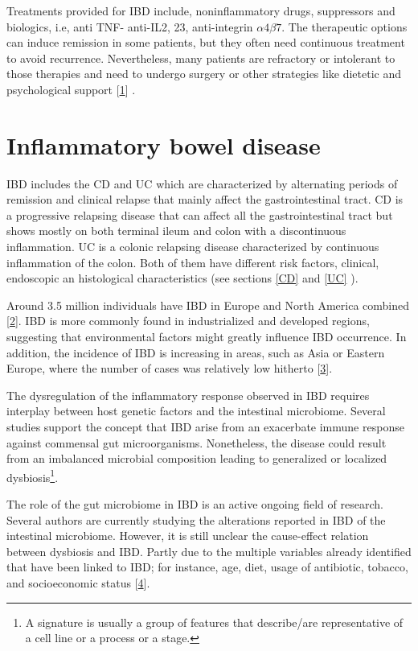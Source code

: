 \documentclass[
  12pt,
  a4paper,
  twoside,
  openright]{book}
\begin{document}
Treatments provided for IBD include, noninflammatory drugs, suppressors and biologics, i.e, anti TNF- anti-IL2, 23, anti-integrin \(\alpha4\beta7\).
The therapeutic options can induce remission in some patients, but they often need continuous treatment to avoid recurrence.
Nevertheless, many patients are refractory or intolerant to those therapies and need to undergo surgery or other strategies like dietetic and psychological support {[}\protect\hyperlink{ref-raine2021}{1}{]} .

\hypertarget{IBD}{%
\section{Inflammatory bowel disease}\label{IBD}}

IBD includes the CD and UC which are characterized by alternating periods of remission and clinical relapse that mainly affect the gastrointestinal tract.
CD is a progressive relapsing disease that can affect all the gastrointestinal tract but shows mostly on both terminal ileum and colon with a discontinuous inflammation.
UC is a colonic relapsing disease characterized by continuous inflammation of the colon.
Both of them have different risk factors, clinical, endoscopic an histological characteristics (see sections \ref{CD} and \ref{UC} ).

Around 3.5 million individuals have IBD in Europe and North America combined {[}\protect\hyperlink{ref-jairath2020}{2}{]}.
IBD is more commonly found in industrialized and developed regions, suggesting that environmental factors might greatly influence IBD occurrence.
In addition, the incidence of IBD is increasing in areas, such as Asia or Eastern Europe, where the number of cases was relatively low hitherto {[}\protect\hyperlink{ref-burisch2015}{3}{]}.

The dysregulation of the inflammatory response observed in IBD requires interplay between host genetic factors and the intestinal microbiome.
Several studies support the concept that IBD arise from an exacerbate immune response against commensal gut microorganisms.
Nonetheless, the disease could result from an imbalanced microbial composition leading to generalized or localized dysbiosis\footnote{A signature is usually a group of features that describe/are representative of a cell line or a process or a stage.}.

The role of the gut microbiome in IBD is an active ongoing field of research.
Several authors are currently studying the alterations reported in IBD of the intestinal microbiome.
However, it is still unclear the cause-effect relation between dysbiosis and IBD.
Partly due to the multiple variables already identified that have been linked to IBD; for instance, age, diet, usage of antibiotic, tobacco, and socioeconomic status {[}\protect\hyperlink{ref-humanmicrobiomeprojectconsortium2012}{4}{]}.
\end{document}

